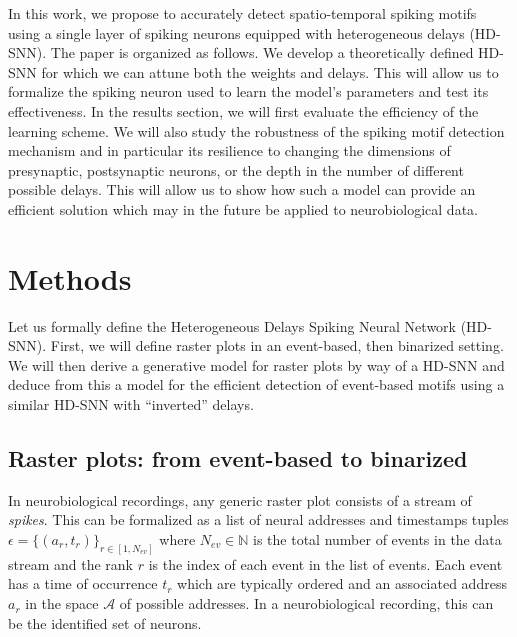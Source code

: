 \documentclass[runningheads]{llncs}
\newcommand{\presynaddr}{a} %
\newcommand{\numevent}{N_{ev}} %
\newcommand{\presynaddrspace}{\mathcal{A}} %
\newcommand{\arank}{r} %
\newcommand{\timev}{t} %
\newcommand{\event}{\epsilon} %
\begin{document}
In this work, we propose to accurately detect spatio-temporal spiking motifs using a single layer of spiking neurons equipped with heterogeneous delays (HD-SNN). The paper is organized as follows. We develop a theoretically defined HD-SNN for which we can attune both the weights and delays. %
This will allow us to formalize the spiking neuron used to learn the model's parameters and test its effectiveness. In the results section, we will first evaluate the efficiency of the learning scheme. We will also study the robustness of the spiking motif detection mechanism and in particular its resilience to changing the dimensions of presynaptic, postsynaptic neurons, or the depth in the number of different possible delays. This will allow us to show how such a model can provide an efficient solution which may in the future be applied to neurobiological data.  %
%
\section{Methods}
\label{sec:methods}
Let us formally define the Heterogeneous Delays Spiking Neural Network (HD-SNN). First, we will define raster plots in an event-based, then binarized setting. We will then derive a generative model for raster plots by way of a HD-SNN and deduce from this a model for the efficient detection of event-based motifs using a similar HD-SNN with ``inverted'' delays.
%
\subsection{Raster plots: from event-based to binarized}
%
In neurobiological recordings, %
any generic raster plot consists of a stream of \emph{spikes}. This can be formalized as a list of neural addresses and timestamps tuples $\event = \{(\presynaddr_\arank, \timev_\arank)\}_{\arank \in [1,\numevent]}$ where $\numevent \in \mathbb{N}$ is the total number of events in the data stream and the rank $\arank$ is the index of each event in the list of events. Each event has a time of occurrence $\timev_\arank$ which are typically ordered and an associated address $\presynaddr_\arank$ in the space $\presynaddrspace$ of possible addresses. In a neurobiological recording, this can be the identified set of neurons.
\end{document}
